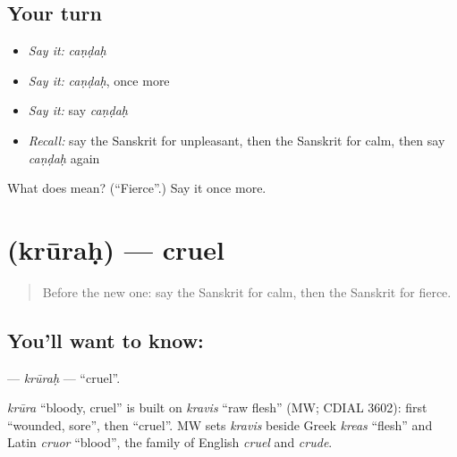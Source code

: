 \subsection*{Your turn}
\begin{itemize}
\raggedright
  \item \emph{Say it:} \emph{caṇḍaḥ}
  \item \emph{Say it:} \emph{caṇḍaḥ}, once more
  \item \emph{Say it:} say \emph{caṇḍaḥ}
  \item \emph{Recall:} say the Sanskrit for unpleasant, then the Sanskrit for calm, then say \emph{caṇḍaḥ} again
\end{itemize}

\begin{tcolorbox}[breakable,colback=teal!4,colframe=teal!35!black,title={Before you move on}]
What does  mean? (\textquotedblleft{}Fierce\textquotedblright{}.) Say it once more.
\end{tcolorbox}
\section[\texorpdfstring{\sk{क्रूरः} (krūraḥ)}{क्रूरः (krūraḥ)}]{ (krūraḥ) — cruel}

\label{lesson:SA-C156-krurah}



\begin{quote}
Before the new one: say the Sanskrit for calm, then the Sanskrit for fierce.
\end{quote}

\subsection*{You'll want to know: }
\textbf{} — \emph{krūraḥ} — \textquotedblleft{}cruel\textquotedblright{}.

\begin{cousinweb}
\emph{krūra} \textquotedblleft{}bloody, cruel\textquotedblright{} is built on \emph{kravis} \textquotedblleft{}raw flesh\textquotedblright{} (MW; CDIAL 3602): first \textquotedblleft{}wounded, sore\textquotedblright{}, then \textquotedblleft{}cruel\textquotedblright{}. MW sets \emph{kravis} beside Greek \emph{kreas} \textquotedblleft{}flesh\textquotedblright{} and Latin \emph{cruor} \textquotedblleft{}blood\textquotedblright{}, the family of English \emph{cruel} and \emph{crude}.
\end{cousinweb}

